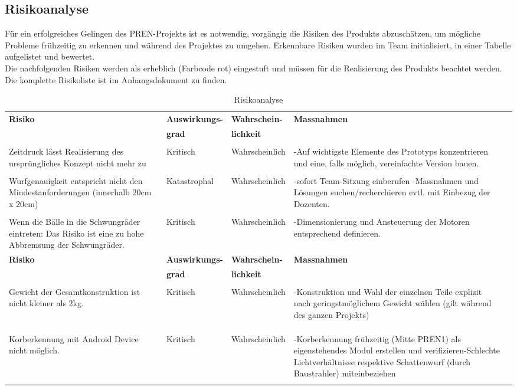 \subsection{Risikoanalyse}
Für ein erfolgreiches Gelingen des PREN-Projekts ist es notwendig, vorgängig die Risiken des Produkts abzuschätzen, 
um mögliche Probleme frühzeitig zu erkennen und während des Projektes zu umgehen. Erkennbare Risiken wurden im Team 
initialisiert, in einer Tabelle aufgelistet und bewertet. \\
Die nachfolgenden Risiken werden als erheblich (Farbcode rot) eingestuft und müssen für die Realisierung des Produkts beachtet werden. 
Die komplette Risikoliste ist im Anhangsdokument zu finden.

 \begin{longtable}{p{5cm}l ll m{4cm}}
 	\textbf{Risiko} & \textbf{Auswirkungs-} & \textbf{Wahrschein-} & \textbf{Massnahmen} \\
 	                & \textbf{grad}         & \textbf{lichkeit}    & \\
 	     
 	\hline     &       &                              &             \\
	Zeitdruck lässt Realisierung des ursprüngliches Konzept nicht mehr zu &  Kritisch & Wahrscheinlich & \multirow{1}{5cm}{-Auf wichtigste Elemente des Prototyps konzentrieren und eine, falls möglich, vereinfachte Version bauen.} \\
	&&&\\
	Wurfgenauigkeit entspricht nicht den Mindestanforderungen (innerhalb 20cm x 20cm) & Katastrophal & Wahrscheinlich &  \multirow{1}{5cm}{-sofort Team-Sitzung einberufen
	-Massnahmen und Lösungen suchen/recherchieren evtl. mit Einbezug der Dozenten.}\\
    &&&\\
	Wenn die Bälle in die Schwungräder eintreten: Das Risiko ist eine zu hohe Abbremsung der Schwungräder. & Kritisch & Wahrscheinlich & \multirow{1}{5cm}{-Dimensionierung und Ansteuerung der Motoren entsprechend definieren.}\\
	\newpage
	\textbf{Risiko} & \textbf{Auswirkungs-} & \textbf{Wahrschein-} & \textbf{Massnahmen} \\
	& \textbf{grad}         & \textbf{lichkeit}    & \\
	
	\hline     &       &                              &             \\
	Gewicht der Gesamtkonstruktion ist nicht kleiner als 2kg. & Kritisch & Wahrscheinlich & \multirow{1}{5cm}{-Konstruktion und Wahl der einzelnen Teile explizit nach geringstmöglichem Gewicht wählen (gilt während des ganzen Projekts)}\\
	&&&\\
	&&&\\
	&&&\\
	Korberkennung mit Android Device nicht möglich. & Kritisch & Wahrscheinlich & \multirow{1}{5cm}{-Korberkennung frühzeitig (Mitte PREN1) als eigenstehendes Modul erstellen und verifizieren-Schlechte Lichtverhältnisse respektive Schattenwurf (durch Baustrahler) miteinbeziehen}
	\\
	
	 
 	
 	\caption{Risikoanalyse}
 	\label{tab:RikisoanalyseTabelle}
 \end{longtable}
